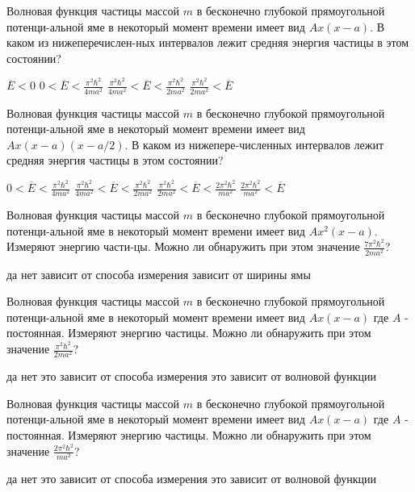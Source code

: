 \documentclass[11pt,a4paper]{exam}
\begin{document}
\begin{questions}
\question Волновая функция частицы массой $m$ в бесконечно глубокой прямоугольной потенци-альной яме в некоторый момент времени имеет вид $Ax(x - a)$. В каком из нижеперечислен-ных интервалов лежит средняя энергия частицы в этом состоянии?
\begin{choices}
\choice $\overline E  < 0$    
\choice $0 < \overline E  < \frac{{{\pi ^2}{\hbar ^2}}}{{4m{a^2}}}$     
\choice $\frac{{{\pi ^2}{\hbar ^2}}}{{4m{a^2}}} < \overline E  < \frac{{{\pi ^2}{\hbar ^2}}}{{2m{a^2}}}$    
\choice $\frac{{{\pi ^2}{\hbar ^2}}}{{2m{a^2}}} < \overline E $
\end{choices}

\question Волновая функция частицы массой $m$ в бесконечно глубокой прямоугольной потенци-альной яме в некоторый момент времени имеет вид $Ax(x - a)(x - a/2)$. В каком из нижепере-численных интервалов лежит средняя энергия частицы в этом состоянии?
\begin{choices}
\choice $0 < \overline E  < \frac{{{\pi ^2}{\hbar ^2}}}{{4m{a^2}}}$  
\choice $\frac{{{\pi ^2}{\hbar ^2}}}{{4m{a^2}}} < \overline E  < \frac{{{\pi ^2}{\hbar ^2}}}{{2m{a^2}}}$    
\choice $\frac{{{\pi ^2}{\hbar ^2}}}{{2m{a^2}}} < \overline E  < \frac{{2{\pi ^2}{\hbar ^2}}}{{m{a^2}}}$ 
\choice $\frac{{2{\pi ^2}{\hbar ^2}}}{{m{a^2}}} < \overline E $
\end{choices}

\question Волновая функция частицы массой $m$ в бесконечно глубокой прямоугольной потенци-альной яме в некоторый момент времени имеет вид $A{x^2}(x - a)$. Измеряют энергию части-цы. Можно ли обнаружить при этом значение $\frac{{7{\pi ^2}{\hbar ^2}}}{{2m{a^2}}}$?
\begin{choices}
\choice да    
\choice нет      
\choice зависит от способа измерения     
\choice зависит от ширины ямы
\end{choices}

\question Волновая функция частицы массой $m$ в бесконечно глубокой прямоугольной потенци-альной яме в некоторый момент времени имеет вид $Ax(x - a)$ где $A$ - постоянная. Измеряют энергию частицы. Можно ли обнаружить при этом значение $\frac{{{\pi ^2}{\hbar ^2}}}{{2m{a^2}}}$?
\begin{choices}
\choice да                
\choice нет
\choice это зависит от способа измерения 
\choice это зависит от волновой функции
\end{choices}

\question Волновая функция частицы массой $m$ в бесконечно глубокой прямоугольной потенци-альной яме в некоторый момент времени имеет вид $Ax(x - a)$ где $A$ - постоянная. Измеряют энергию частицы. Можно ли обнаружить при этом значение $\frac{{2{\pi ^2}{\hbar ^2}}}{{m{a^2}}}$?
\begin{choices}
\choice да                
\choice нет
\choice это зависит от способа измерения 
\choice это зависит от волновой функции
\end{choices}


\end{questions}
\end{document}
